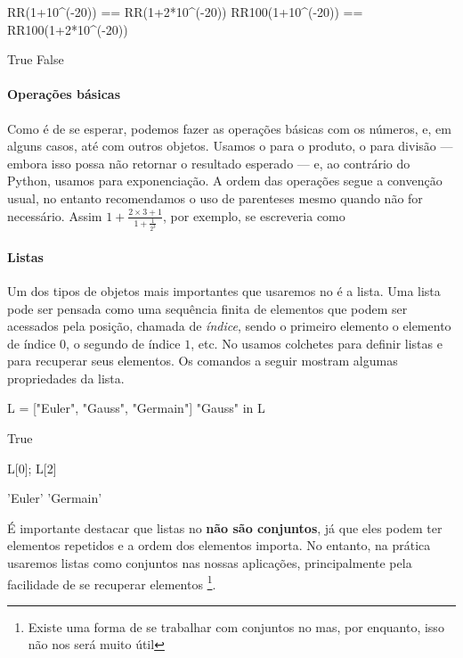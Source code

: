 \begin{sageinput}
RR(1+10^(-20)) == RR(1+2*10^(-20))
RR100(1+10^(-20)) == RR100(1+2*10^(-20))                      
\end{sageinput}
\begin{sageoutput}
True
False
\end{sageoutput}

\paragraph{Operações básicas}

Como é de se esperar, podemos fazer as operações
básicas com os números, e, em alguns casos, até com outros objetos. Usamos
o \ils{*} para o produto, o \ils{/} para divisão ---
embora isso possa não retornar o resultado esperado ---
e, ao contrário do Python, usamos \ils{\^{}} para exponenciação.
A ordem das operações segue a convenção usual, no entanto
recomendamos o uso de parenteses mesmo quando não for necessário.
Assim $1 + \frac{2\times 3+1}{1+\frac{1}{2^3}}$, por
exemplo, se escreveria como



\paragraph{Listas}


Um dos tipos de objetos mais importantes que usaremos
no \Sage é a lista. Uma lista pode ser pensada como
uma sequência finita de elementos que podem
ser acessados pela posição, chamada de \emph{índice}, sendo
o primeiro elemento o elemento de índice $0$, o 
segundo de índice $1$, etc. No \Sage usamos colchetes
para definir listas e para recuperar seus elementos. Os comandos 
a seguir mostram algumas propriedades da lista. 

\begin{sageinput}
L = ["Euler", "Gauss", "Germain"]
"Gauss" in L
\end{sageinput}
\begin{sageoutput}
True
\end{sageoutput}

\begin{sageinput}
L[0]; L[2]
\end{sageinput}
\begin{sageoutput}
'Euler'
'Germain'
\end{sageoutput}

É importante destacar que listas no \Sage \textbf{não são conjuntos},
já que eles podem ter elementos repetidos e a ordem dos elementos importa.
No entanto, na prática usaremos listas como conjuntos nas nossas
aplicações, principalmente pela facilidade de se recuperar elementos
\footnote{Existe uma forma de se trabalhar com conjuntos
no \Sage mas, por enquanto, isso não nos será muito útil}.

